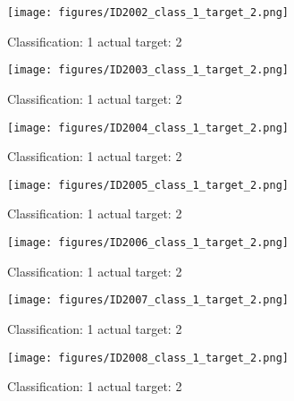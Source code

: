 \begin{figure}[h!]
\begin{center}
\texttt{[image: figures/ID2002\_class\_1\_target\_2.png]}
\end{center}
\caption{ Classification: 1 actual target: 2}
\label{fig:ID2002_class_1_target_2}
\end{figure}
\begin{figure}[h!]
\begin{center}
\texttt{[image: figures/ID2003\_class\_1\_target\_2.png]}
\end{center}
\caption{ Classification: 1 actual target: 2}
\label{fig:ID2003_class_1_target_2}
\end{figure}
\begin{figure}[h!]
\begin{center}
\texttt{[image: figures/ID2004\_class\_1\_target\_2.png]}
\end{center}
\caption{ Classification: 1 actual target: 2}
\label{fig:ID2004_class_1_target_2}
\end{figure}
\begin{figure}[h!]
\begin{center}
\texttt{[image: figures/ID2005\_class\_1\_target\_2.png]}
\end{center}
\caption{ Classification: 1 actual target: 2}
\label{fig:ID2005_class_1_target_2}
\end{figure}
\begin{figure}[h!]
\begin{center}
\texttt{[image: figures/ID2006\_class\_1\_target\_2.png]}
\end{center}
\caption{ Classification: 1 actual target: 2}
\label{fig:ID2006_class_1_target_2}
\end{figure}
\begin{figure}[h!]
\begin{center}
\texttt{[image: figures/ID2007\_class\_1\_target\_2.png]}
\end{center}
\caption{ Classification: 1 actual target: 2}
\label{fig:ID2007_class_1_target_2}
\end{figure}
\begin{figure}[h!]
\begin{center}
\texttt{[image: figures/ID2008\_class\_1\_target\_2.png]}
\end{center}
\caption{ Classification: 1 actual target: 2}
\label{fig:ID2008_class_1_target_2}
\end{figure}
